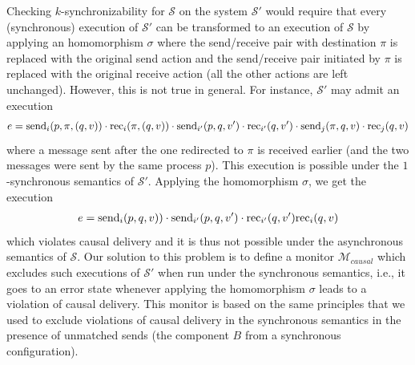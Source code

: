 Checking $k$-synchronizability for $\mathcal{S}$ on the system $\mathcal{S'}$ would require that every (synchronous) execution of $\mathcal{S'}$ can be transformed to an execution of $\mathcal{S}$ by applying an homomorphism $\sigma$ where the send/receive pair with destination $\pi$ is replaced with the original send action and the send/receive pair initiated by $\pi$ is replaced with the original receive action (all the other actions are left unchanged). However, this is not true in general. For instance, $\mathcal{S'}$ may admit an execution 
\begin{align*}
e=\mathrm{send}_{i}({p,\pi,(q,v)})\cdot \mathrm{rec}_{i}({\pi,(q,v)})\cdot \mathrm{send}_{i'}({p,q,v'})\cdot \mathrm{rec}_{i'}({q,v'})\cdot \mathrm{send}_{j}({\pi,q,v})\cdot \mathrm{rec}_{j}({q,v})
\end{align*}
where a message sent after the one redirected to $\pi$ is received earlier (and the two messages were sent by the same process $p$). This execution is possible under the $1$-synchronous semantics of $\mathcal{S'}$. Applying the homomorphism $\sigma$, we get the execution 
\begin{align*}
e=\mathrm{send}_{i}({p,q,v)})\cdot \mathrm{send}_{i'}({p,q,v'})\cdot \mathrm{rec}_{i'}({q,v'})\mathrm{rec}_{i}({q,v})
\end{align*}
which violates causal delivery and it is thus not possible under the asynchronous semantics of $\mathcal{S}$.
Our solution to this problem is to define a monitor $\mathcal{M}_{\mathit{causal}}$ which excludes such executions of $\mathcal{S'}$ when run under the synchronous semantics, i.e., it goes to an error state whenever applying the homomorphism $\sigma$ leads to a violation of causal delivery. This monitor is based on the same principles that we used to exclude violations of causal delivery in the synchronous semantics in the presence of unmatched sends (the component $B$ from a synchronous configuration).

